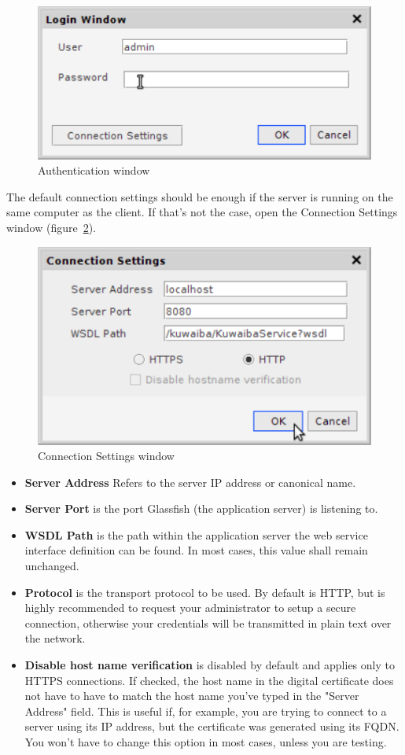\documentclass[a4paper]{article}
\begin{document}
	\begin{figure}[h!]
		\centering
		\includegraphics[width=0.5\linewidth]{img/auth_window.png}
		\caption{Authentication window}
		\label{fig:auth_window}
	\end{figure}
	The default connection settings should be enough if the server is running on the same computer as the client. If that's not the case, open the Connection Settings window (figure~\ref{fig:connection_settings}).
	\begin{figure}[h!]
		\centering
		\includegraphics[width=0.5\linewidth]{img/connection_settings.png}
		\caption{Connection Settings window}
		\label{fig:connection_settings}
	\end{figure}
	\begin{itemize}
		\item \textbf{Server Address} Refers to the server IP address or canonical name.
		\item \textbf{Server Port} is the port Glassfish (the application server) is listening to.
		\item \textbf{WSDL Path} is the path within the application server the web service interface definition can be found. In most cases, this value shall remain unchanged.
		\item \textbf{Protocol} is the transport protocol to be used. By default is HTTP, but is highly recommended to request your administrator to setup a secure connection, otherwise your credentials will be transmitted in plain text over the network.
		\item \textbf{Disable host name verification} is disabled by default and applies only to HTTPS connections. If checked, the host name in the digital certificate does not have to have to match the host name you've typed in the "Server Address" field. This is useful if, for example, you are trying to connect to a server using its IP address, but the certificate was generated using its FQDN. You won't have to change this option in most cases, unless you are testing.
	\end{itemize}
\end{document}
